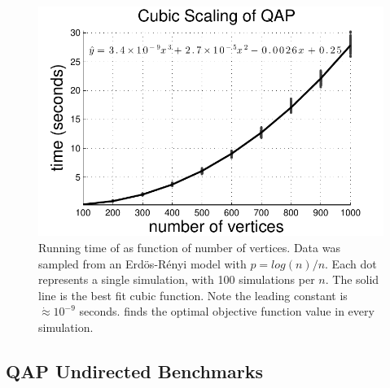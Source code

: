 \documentclass[10pt,journal,cspaper,compsoc]{IEEEtran}
\begin{document}
\begin{figure}[htbp]
	\centering			
	\includegraphics[width=1.0\linewidth]{../figs/ErdosRenyi_results.pdf}
	\caption{Running time of \FAQ as function of number of vertices. Data was sampled from an Erd\"os-R\'enyi model with $p=log(n)/n$.  Each dot represents a single simulation, with 100 simulations per $n$.  The solid line is the best fit cubic function.  Note the leading constant is $\dot{\approx} 10^{-9}$ seconds. \FAQ finds the optimal objective function value in every simulation.}
	\label{fig:scaling}
\end{figure}



\subsection{QAP Undirected Benchmarks}
\label{sub:undirected}
\end{document}
